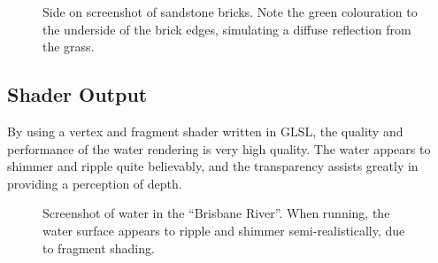         \begin{figure}[H]
            \centering
            \caption{
                Side on screenshot of sandstone bricks. Note the green colouration to the underside of the brick edges, simulating a diffuse reflection from the grass.
            }
            \label{fig:bump_and_hemisphere}
        \end{figure}

    \subsection{Shader Output} %
    \label{sub:shader_output}
        By using a vertex and fragment shader written in GLSL, the quality and performance of the water rendering is very high quality.
        The water appears to shimmer and ripple quite believably, and the transparency assists greatly in providing a perception of depth.

        \begin{figure}[H]
            \centering
            \caption{
                Screenshot of water in the ``Brisbane River''.
                When running, the water surface appears to ripple and shimmer semi-realistically, due to fragment shading.
            }
            \label{fig:water}
        \end{figure}
